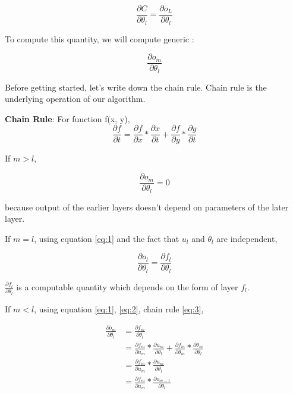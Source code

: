 \documentclass[a4paper]{tufte-handout}
\begin{document}
\[ \frac{\partial C}{\partial\theta_l} = \frac{\partial o_L}{\partial\theta_l} \]


To compute this quantity, we will compute generic
:

\[ \frac{\partial o_m}{\partial \theta_l} \]

Before getting started, let's write down the chain rule. Chain rule is
the underlying operation of our algorithm.

\begin{framed}
\textbf{Chain Rule}: For function f(x, y), 
\begin{equation}
\frac{\partial f}{\partial t} = \frac{\partial f}{\partial x} * \frac{\partial x}{\partial t} + \frac{\partial f}{\partial y} * \frac{\partial y}{\partial t}
\label{eq:3}
\end{equation}

\end{framed}

If \(m > l\),

\begin{equation}
\frac{\partial o_m}{\partial \theta_l} = 0 \label{eq:4}
\end{equation}


because output of the earlier layers doesn't depend on parameters of the later
layer.

If \(m = l\), using equation \eqref{eq:1} and the fact that \(u_l\) and
\(\theta_l\) are independent,

\begin{equation}
\frac{\partial o_l}{\partial \theta_l} = \frac{\partial f_l}{\partial \theta_l}
\label{eq:5}
\end{equation}

\(\frac{\partial f_l}{\partial \theta_l}\) is a computable quantity
which depends on the form of layer \(f_l\).

If \(m < l\), using equation \eqref{eq:1}, \eqref{eq:2}, chain rule \eqref{eq:3},

\begin{align*}
\frac{\partial o_m}{\partial \theta_l} &= \frac{\partial f_m}{\partial \theta_l}\\
&= \frac{\partial f_m}{\partial u_m} * \frac{\partial u_m}{\partial \theta_l} + \frac{\partial f_m}{\partial \theta_m} * \frac{\partial \theta_m}{\partial \theta_l}\\
&= \frac{\partial f_m}{\partial u_m} * \frac{\partial u_m}{\partial \theta_l}\\
&= \frac{\partial f_m}{\partial u_m} * \frac{\partial o_{m-1}}{\partial \theta_l}
\end{align*}
\end{document}
